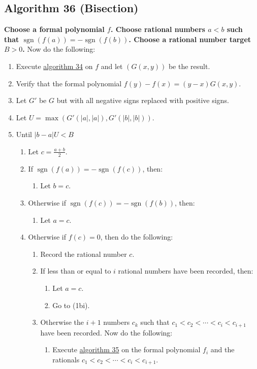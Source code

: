 \documentclass[twocolumn]{article}
\DeclareMathOperator{\sgn}{sgn}
\begin{document}
		\subsection{Algorithm 36 (Bisection)}\label{sec:algorithm 36}
			\textbf{Choose a formal polynomial $f$. Choose rational numbers $a<b$ such that $\sgn(f(a))=-\sgn(f(b))$. Choose a rational number target $B>0$.} Now do the following:
			\begin{enumerate}
				\item Execute \hyperref[sec:algorithm 34]{algorithm 34} on $f$ and let $(G(x,y))$ be the result.
				\item Verify that the formal polynomial $f(y)-f(x)=(y-x)G(x,y)$.
				\item Let $G'$ be $G$ but with all negative signs replaced with positive signs.
				\item Let $U=\max(G'(\lvert a\rvert,\lvert a\rvert), G'(\lvert b\rvert,\lvert b\rvert))$.
				\item Until $\lvert b-a\rvert U<B$
				\begin{enumerate}
					\item Let $c=\frac{a+b}{2}$.
					\item If $\sgn(f(a))=-\sgn(f(c))$, then:
					\begin{enumerate}
						\item Let $b=c$.
					\end{enumerate}
					\item Otherwise if $\sgn(f(c))=-\sgn(f(b))$, then:
					\begin{enumerate}
						\item Let $a=c$.
					\end{enumerate}
					\item Otherwise if $f(c)=0$, then do the following:
					\begin{enumerate}
						\item Record the rational number $c$.
						\item If less than or equal to $i$ rational numbers have been recorded, then:
						\begin{enumerate}
							\item Let $a=c$.
							\item Go to (1bi).
						\end{enumerate}
						\item Otherwise the $i+1$ numbers $c_k$ such that $c_1<c_2<\cdots<c_i<c_{i+1}$ have been recorded. Now do the following:
						\begin{enumerate}
							\item Execute \hyperref[sec:algorithm 35]{algorithm 35} on the formal polynomial $f_i$ and the rationals $c_1<c_2<\cdots<c_i<c_{i+1}$.

\end{enumerate}
\end{enumerate}
\end{enumerate}
\end{enumerate}
\end{document}
